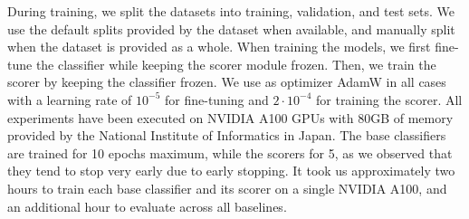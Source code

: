 During training, we split the datasets into training, validation, and test sets. We use the default splits provided by the dataset when available, and manually split when the dataset is provided as a whole.
When training the models, we first fine-tune the classifier while keeping the scorer module frozen. Then, we train the scorer by keeping the classifier frozen. We use as optimizer AdamW \cite{adamw} in all cases with a learning rate of $10^{-5}$ for fine-tuning and $2 \cdot 10^{-4}$ for training the scorer. All experiments have been executed on NVIDIA A100 GPUs with 80GB of memory provided by the National Institute of Informatics in Japan. The base classifiers are trained for 10 epochs maximum, while the scorers for 5, as we observed that they tend to stop very early due to early stopping. It took us approximately two hours to train each base classifier and its scorer on a single NVIDIA A100, and an additional hour to evaluate across all baselines.